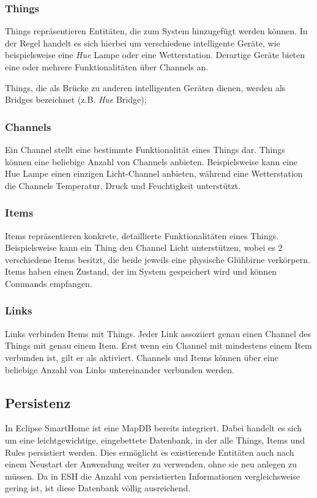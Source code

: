 \subsubsection{Things}
Things repräsentieren Entitäten, die zum System hinzugefügt werden können. In der Regel handelt es sich hierbei um verschiedene intelligente Geräte, wie beispielsweise eine \textit{Hue} Lampe oder eine Wetterstation. Derartige Geräte bieten eine oder mehrere Funktionalitäten über Channels an.

Things, die als Brücke zu anderen intelligenten Geräten dienen, werden als Bridges bezeichnet (z.B. \textit{Hue} Bridge);

\subsubsection{Channels}
Ein Channel stellt eine bestimmte Funktionalität eines Things dar. Things können eine beliebige Anzahl von Channels anbieten. Beispielsweise kann eine Hue Lampe einen einzigen \glqq Licht\grqq -Channel anbieten, während eine Wetterstation die Channels \glqq Temperatur\grqq , \glqq Druck\grqq{} und \glqq Feuchtigkeit\grqq{} unterstützt.

\subsubsection{Items}
Items repräsentieren konkrete, detaillierte Funktionalitäten eines Things. Beispielsweise kann ein Thing den Channel \glqq Licht\grqq{} unterstützen, wobei es 2 verschiedene Items besitzt, die beide jeweils eine physische Glühbirne verkörpern. Items haben einen Zustand, der im System gespeichert wird und können Commands empfangen.

\subsubsection{Links}
Links verbinden Items mit Things. Jeder Link assoziiert genau einen Channel des Things mit genau einem Item. Erst wenn ein Channel mit mindestens einem Item verbunden ist, gilt er als \glqq aktiviert\grqq{}. Channels und Items können über eine beliebige Anzahl von Links untereinander verbunden werden.


\subsection{Persistenz}
\label{subsec:persistenz}
In Eclipse SmartHome ist eine MapDB\cite{mapDB} bereits integriert. Dabei handelt es sich um eine leichtgewichtige, eingebettete Datenbank, in der alle Things, Items und Rules persistiert werden. Dies ermöglicht es existierende Entitäten auch nach einem Neustart der Anwendung weiter zu verwenden, ohne sie neu anlegen zu müssen. Da in ESH die Anzahl von persistierten Informationen vergleichsweise gering ist, ist diese Datenbank völlig ausreichend.


